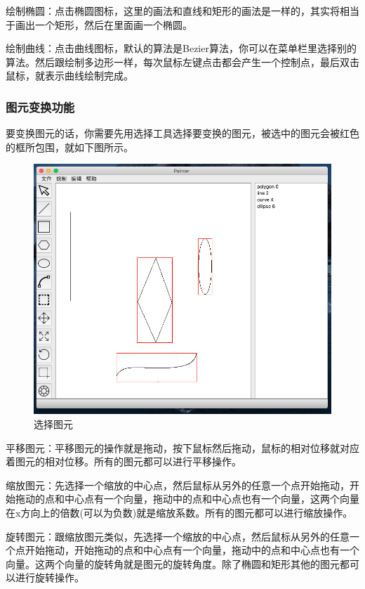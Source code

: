 \documentclass[a4paper,UTF8]{article}
\theoremstyle{definition}
\begin{document}
绘制椭圆：点击椭圆图标，这里的画法和直线和矩形的画法是一样的，其实将相当于画出一个矩形，然后在里面画一个椭圆。

绘制曲线：点击曲线图标，默认的算法是Bezier算法，你可以在菜单栏里选择别的算法。然后跟绘制多边形一样，每次鼠标左键点击都会产生一个控制点，最后双击鼠标，就表示曲线绘制完成。

\subsubsection{图元变换功能}

要变换图元的话，你需要先用选择工具选择要变换的图元，被选中的图元会被红色的框所包围，就如下图所示。

\begin{figure}[H]
    \centering
    \includegraphics[scale=0.5]{select.png}
    \caption{选择图元}
\end{figure}

平移图元：平移图元的操作就是拖动，按下鼠标然后拖动，鼠标的相对位移就对应着图元的相对位移。所有的图元都可以进行平移操作。

缩放图元：先选择一个缩放的中心点，然后鼠标从另外的任意一个点开始拖动，开始拖动的点和中心点有一个向量，拖动中的点和中心点也有一个向量，这两个向量在x方向上的倍数(可以为负数)就是缩放系数。所有的图元都可以进行缩放操作。

旋转图元：跟缩放图元类似，先选择一个缩放的中心点，然后鼠标从另外的任意一个点开始拖动，开始拖动的点和中心点有一个向量，拖动中的点和中心点也有一个向量。这两个向量的旋转角就是图元的旋转角度。除了椭圆和矩形其他的图元都可以进行旋转操作。
\end{document}
